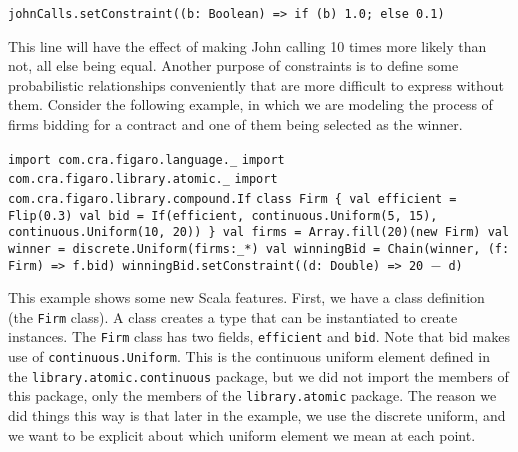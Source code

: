 \begin{flushleft}
\texttt{johnCalls.setConstraint((b: Boolean) => 
\newline \tab if (b) 1.0; else 0.1)}
\end{flushleft}

This line will have the effect of making John calling 10 times more likely than not, all else being equal. Another purpose of constraints is to define some probabilistic relationships conveniently that are more difficult to express without them. Consider the following example, in which we are modeling the process of firms bidding for a contract and one of them being selected as the winner.

\begin{flushleft}
\texttt{import com.cra.figaro.language.\_}
\newline \texttt{import com.cra.figaro.library.atomic.\_}
\newline \texttt{import com.cra.figaro.library.compound.If}
\newline
\newline \texttt{class Firm \{
\newline \tab val efficient = Flip(0.3)
\newline \tab val bid = If(efficient, continuous.Uniform(5, 15),
\newline continuous.Uniform(10, 20))
\newline \} 
\newline
\newline \texttt{val firms = Array.fill(20)(new Firm)
\newline val winner = discrete.Uniform(firms:\_*)
\newline val winningBid = Chain(winner, (f: Firm) => f.bid)
\newline winningBid.setConstraint((d: Double) => 20 $-$ d)}
}
\end{flushleft}

This example shows some new Scala features. First, we have a class definition (the \texttt{Firm} class). A class creates a type that can be instantiated to create instances. The \texttt{Firm} class has two fields, \texttt{efficient} and \texttt{bid}. Note that bid makes use of \texttt{continuous.Uniform}. This is the continuous uniform element defined in the \texttt{library.atomic.continuous} package, but we did not import the members of this package, only the members of the \texttt{library.atomic} package. The reason we did things this way is that later in the example, we use the discrete uniform, and we want to be explicit about which uniform element we mean at each point.


